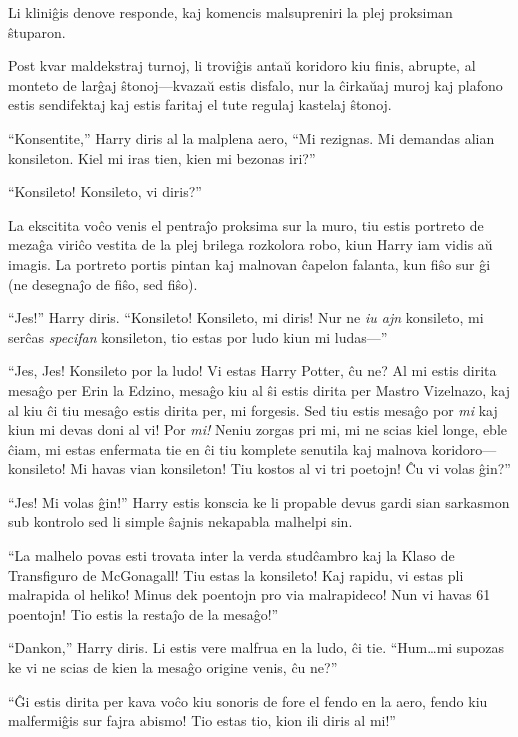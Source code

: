 Li kliniĝis denove responde, kaj komencis malsupreniri la plej
proksiman ŝtuparon.

Post kvar maldekstraj turnoj, li troviĝis antaŭ koridoro kiu finis, abrupte, al
monteto de larĝaj ŝtonoj—kvazaŭ estis disfalo, nur la ĉirkaŭaj muroj kaj plafono
estis sendifektaj kaj estis faritaj el tute regulaj kastelaj ŝtonoj.

``Konsentite,'' Harry diris al la malplena aero, ``Mi rezignas. Mi
demandas alian konsileton. Kiel mi iras tien, kien mi bezonas iri?''

``Konsileto! Konsileto, vi diris?''

La ekscitita voĉo venis el pentraĵo proksima sur la muro, tiu estis portreto de
mezaĝa viriĉo vestita de la plej brilega rozkolora robo, kiun Harry iam vidis aŭ
imagis. La portreto portis pintan kaj malnovan ĉapelon falanta, kun fiŝo sur ĝi
(ne desegnaĵo de fiŝo, sed fiŝo).

``Jes!'' Harry diris. ``Konsileto! Konsileto, mi diris! Nur ne \emph{iu ajn}
konsileto, mi serĉas \emph{specifan} konsileton, tio estas por ludo kiun mi
ludas—''

``Jes, Jes! Konsileto por la ludo! Vi estas Harry Potter, ĉu ne? Al mi estis
dirita mesaĝo per Erin la Edzino, mesaĝo kiu al ŝi estis dirita per Mastro
Vizelnazo, kaj al kiu ĉi tiu mesaĝo estis dirita per, mi forgesis. Sed tiu estis
mesaĝo por \emph{mi} kaj kiun mi devas doni al vi! Por \emph{mi!} Neniu zorgas
pri mi, mi ne scias kiel longe, eble ĉiam, mi estas enfermata tie en ĉi tiu
komplete senutila kaj malnova koridoro—konsileto! Mi havas vian konsileton! Tiu
kostos al vi tri poetojn! Ĉu vi volas ĝin?''

``Jes! Mi volas ĝin!'' Harry estis konscia ke li propable devus gardi
sian sarkasmon sub kontrolo sed li simple ŝajnis nekapabla malhelpi
sin.

``La malhelo povas esti trovata inter la verda studĉambro kaj la Klaso de
Transfiguro de McGonagall! Tiu estas la konsileto! Kaj rapidu, vi estas pli
malrapida ol heliko! Minus dek poentojn pro via malrapideco! Nun vi havas 61
poentojn! Tio estis la restaĵo de la mesaĝo!''

``Dankon,'' Harry diris. Li estis vere malfrua en la ludo, ĉi
tie. ``Hum\ldots mi supozas ke vi ne scias de kien la mesaĝo origine
venis, ĉu ne?'' 

``Ĝi estis dirita per kava voĉo kiu sonoris de fore el fendo en la aero, fendo
kiu malfermiĝis sur fajra abismo! Tio estas tio, kion ili diris al mi!''

